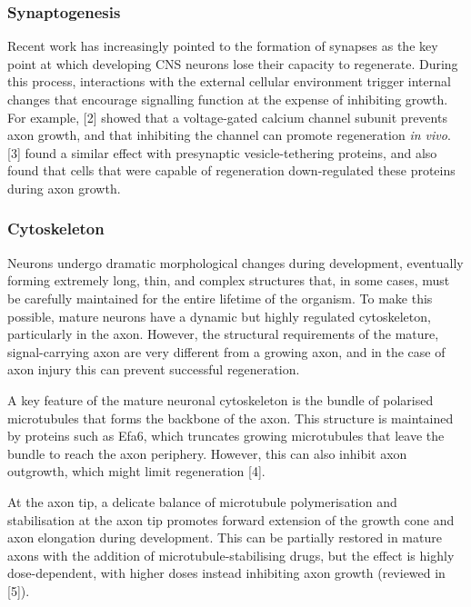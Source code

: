\documentclass[
  12pt,
  a4paper,
]{book}
\begin{document}
\hypertarget{synaptogenesis}{%
\subsubsection{Synaptogenesis}\label{synaptogenesis}}

Recent work has increasingly pointed to the formation of synapses as the key point at which developing CNS neurons lose their capacity to regenerate. During this process, interactions with the external cellular environment trigger internal changes that encourage signalling function at the expense of inhibiting growth. For example, {[}2{]} showed that a voltage-gated calcium channel subunit prevents axon growth, and that inhibiting the channel can promote regeneration \emph{in vivo}. {[}3{]} found a similar effect with presynaptic vesicle-tethering proteins, and also found that cells that were capable of regeneration down-regulated these proteins during axon growth.

\hypertarget{cytoskeleton}{%
\subsubsection{Cytoskeleton}\label{cytoskeleton}}

Neurons undergo dramatic morphological changes during development, eventually forming extremely long, thin, and complex structures that, in some cases, must be carefully maintained for the entire lifetime of the organism. To make this possible, mature neurons have a dynamic but highly regulated cytoskeleton, particularly in the axon. However, the structural requirements of the mature, signal-carrying axon are very different from a growing axon, and in the case of axon injury this can prevent successful regeneration.

A key feature of the mature neuronal cytoskeleton is the bundle of polarised microtubules that forms the backbone of the axon. This structure is maintained by proteins such as Efa6, which truncates growing microtubules that leave the bundle to reach the axon periphery. However, this can also inhibit axon outgrowth, which might limit regeneration {[}4{]}.

At the axon tip, a delicate balance of microtubule polymerisation and stabilisation at the axon tip promotes forward extension of the growth cone and axon elongation during development. This can be partially restored in mature axons with the addition of microtubule-stabilising drugs, but the effect is highly dose-dependent, with higher doses instead inhibiting axon growth (reviewed in {[}5{]}).
\end{document}
